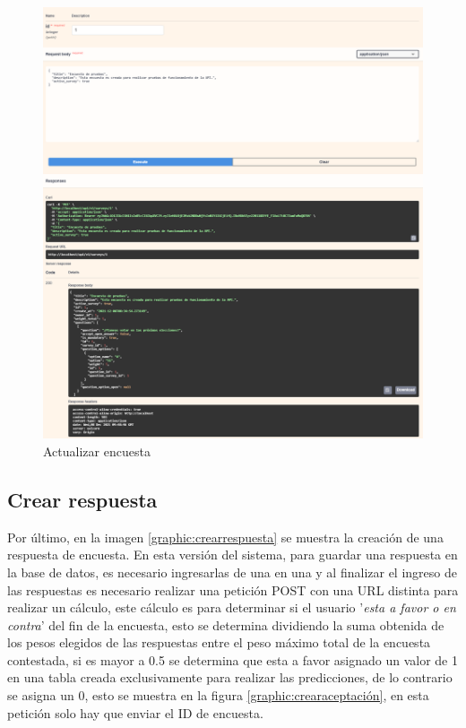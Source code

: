 \begin{figure}[!htb]
    \centering
    \includegraphics[scale=.3]{TT/img/pruebas/test_actualizar_encuesta.png}
    \caption{Actualizar encuesta}
    \label{graphic:actualizarencuesta}
\end{figure}

\subsection{Crear respuesta}
Por último, en la imagen \ref{graphic:crearrespuesta} se muestra la creación de una respuesta de encuesta. En esta versión del sistema, para guardar una respuesta en la base de datos, es necesario ingresarlas de una en una y al finalizar el ingreso de las respuestas es necesario realizar una petición POST con una URL distinta para realizar un cálculo, este cálculo es para determinar si el usuario '\textit{esta a favor o en contra}' del fin de la encuesta, esto se determina dividiendo la suma obtenida de los pesos elegidos de las respuestas entre el peso máximo total de la encuesta contestada, si es mayor a 0.5 se determina que esta a favor asignado un valor de 1 en una tabla creada exclusivamente para realizar las predicciones, de lo contrario se asigna un 0, esto se muestra en la figura \ref{graphic:crearaceptación}, en esta petición solo hay que enviar el ID de encuesta.

